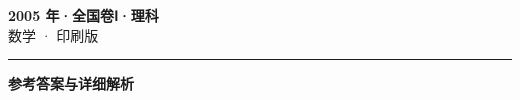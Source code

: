 \documentclass[zihao=5, a4paper]{ctexart}
\begin{document}
\begin{center}
  {\Large\bfseries 2005 年·全国卷Ⅰ·理科}\\[4pt]
  {\large 数学 · 印刷版}
\end{center}
\medskip
{}

\par\bigskip\hrule\bigskip
{}
\begin{center}{\large\bfseries 参考答案与详细解析}\end{center}
\smallskip

\end{document}
